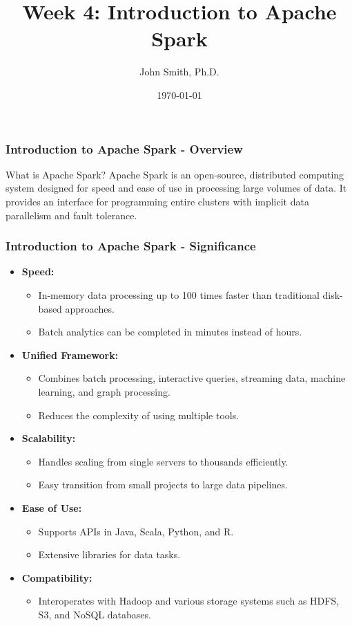 \documentclass[aspectratio=169]{beamer}
\title[Week 4: Introduction to Apache Spark]{Week 4: Introduction to Apache Spark}
\author[J. Smith]{John Smith, Ph.D.}
\institute[University Name]{
  Department of Computer Science\\
  University Name\\
  \vspace{0.3cm}
  Email: email@university.edu\\
  Website: www.university.edu
}
\date{\today}
\begin{document}
\frame{\titlepage}

\begin{frame}[fragile]
    \frametitle{Introduction to Apache Spark - Overview}
    \begin{block}{What is Apache Spark?}
        Apache Spark is an open-source, distributed computing system designed for speed and ease of use in processing large volumes of data. 
        It provides an interface for programming entire clusters with implicit data parallelism and fault tolerance.
    \end{block}
\end{frame}

\begin{frame}[fragile]
    \frametitle{Introduction to Apache Spark - Significance}
    \begin{itemize}
        \item \textbf{Speed:}
            \begin{itemize}
                \item In-memory data processing up to 100 times faster than traditional disk-based approaches.
                \item Batch analytics can be completed in minutes instead of hours.
            \end{itemize}
        \item \textbf{Unified Framework:}
            \begin{itemize}
                \item Combines batch processing, interactive queries, streaming data, machine learning, and graph processing.
                \item Reduces the complexity of using multiple tools.
            \end{itemize}
        \item \textbf{Scalability:}
            \begin{itemize}
                \item Handles scaling from single servers to thousands efficiently.
                \item Easy transition from small projects to large data pipelines.
            \end{itemize}
        \item \textbf{Ease of Use:}
            \begin{itemize}
                \item Supports APIs in Java, Scala, Python, and R.
                \item Extensive libraries for data tasks.
            \end{itemize}
        \item \textbf{Compatibility:}
            \begin{itemize}
                \item Interoperates with Hadoop and various storage systems such as HDFS, S3, and NoSQL databases.
            \end{itemize}
    \end{itemize}
\end{frame}
\end{document}
